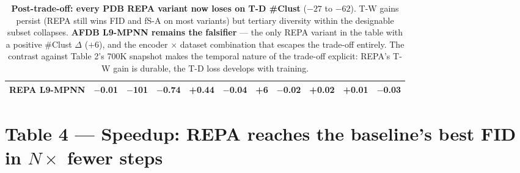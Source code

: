 \documentclass[11pt,a4paper]{article}
\newcommand{\gd}[1]{\cellcolor{green!20}#1}
\newcommand{\rd}[1]{\cellcolor{red!15}#1}
\begin{document}
\begin{table}[H]
{\begin{tabular}{l|cc|ccc|cc|c|cc}
REPA L9-MPNN   & \rd{$-$0.01} & \gd{$-$101} & \gd{$-$0.74} & \gd{+0.44} & \gd{$-$0.04} & \gd{+6} & \gd{$-$0.02} & \rd{+0.02} & \rd{+0.01} & \rd{$-$0.03} \\
\bottomrule
\end{tabular}}
\caption{\textbf{Post-trade-off: every PDB REPA variant now loses on T-D
\#Clust} ($-27$ to $-62$). T-W gains persist (REPA still wins FID and
fS-A on most variants) but tertiary diversity within the designable
subset collapses. \textbf{AFDB L9-MPNN remains the falsifier} --- the
only REPA variant in the table with a positive \#Clust $\Delta$
($+6$), and the encoder $\times$ dataset combination that escapes the
trade-off entirely. The contrast against Table 2's 700K snapshot makes
the temporal nature of the trade-off explicit: REPA's T-W gain is
durable, the T-D loss develops with training.}
\end{table}

\section{Table 4 --- Speedup: REPA reaches the baseline's best FID in $N\times$ fewer steps}
\end{document}
